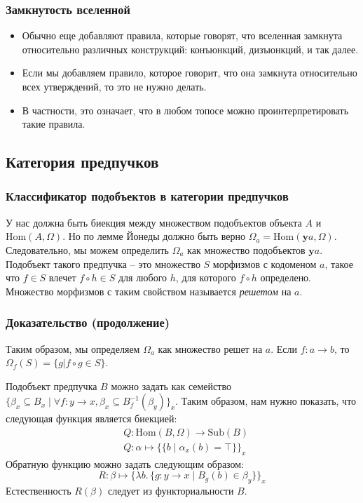 \documentclass{beamer}
\theoremstyle{definition}
\newcommand{\cat}[1]{\mathbf{#1}}
\newcommand{\fs}[1]{\mathrm{#1}}
\newcommand{\Hom}{\fs{Hom}}
\newcommand{\Sub}{\fs{Sub}}
\begin{document}
\begin{frame}
\frametitle{Замкнутость вселенной}
\begin{itemize}
\item Обычно еще добавляют правила, которые говорят, что вселенная замкнута относительно различных конструкций: конъюнкций, дизъюнкций, и так далее.
\item Если мы добавляем правило, которое говорит, что она замкнута относительно всех утверждений, то это не нужно делать.
\item В частности, это означает, что в любом топосе можно проинтерпретировать такие правила.
\end{itemize}
\end{frame}

\subsection{Категория предпучков}

\begin{frame}
\frametitle{Классификатор подобъектов в категории предпучков}
У нас должна быть биекция между множеством подобъектов объекта $A$ и $\Hom(A,\Omega)$.
Но по лемме Йонеды должно быть верно $\Omega_a = \Hom(\cat{y} a, \Omega)$.
Следовательно, мы можем определить $\Omega_a$ как множество подобъектов $\cat{y} a$.
Подобъект такого предпучка -- это множество $S$ морфизмов с кодоменом $a$, такое что $f \in S$ влечет $f \circ h \in S$ для любого $h$, для которого $f \circ h$ определено.
Множество морфизмов с таким свойством называется \emph{решетом} на $a$.
\end{frame}

\begin{frame}
\frametitle{Доказательство (продолжение)}
Таким образом, мы определяем $\Omega_a$ как множество решет на $a$.
Если $f : a \to b$, то $\Omega_f(S) = \{ g | f \circ g \in S \}$.

Подобъект предпучка $B$ можно задать как семейство $\{ \beta_x \subseteq B_x \mid \forall f : y \to x, \beta_x \subseteq B_f^{-1}(\beta_y) \}_x$.
Таким образом, нам нужно показать, что следующая функция является биекцией:
\begin{align*}
& Q : \Hom(B,\Omega) \to \Sub(B) \\
& Q : \alpha \mapsto \{ \{ b \mid \alpha_x(b) = \top \} \}_x
\end{align*}
Обратную функцию можно задать следующим образом:
\[ R : \beta \mapsto \{ \lambda b.\,\{ g : y \to x \mid B_g(b) \in \beta_y \} \}_x \]
Естественность $R(\beta)$ следует из функториальности $B$.
\end{frame}
\end{document}
